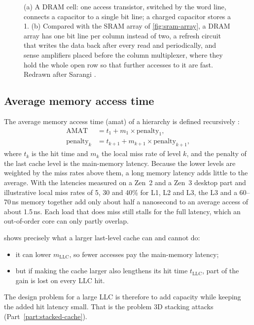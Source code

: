 \begin{figure}[htbp]
\caption[DRAM cell and array]{(a) A DRAM cell: one access transistor, switched by the word line, connects a capacitor to a single bit line; a charged capacitor stores a 1. (b) Compared with the SRAM array of \cref{fig:sram-array}, a DRAM array has one bit line per column instead of two, a refresh circuit that writes the data back after every read and periodically, and sense amplifiers placed before the column multiplexer, where they hold the whole open row so that further accesses to it are fast. Redrawn after Sarangi \cite[sec.~7.4.3, Figs.~7.30--7.31]{sarangi2025basic}.}
\label{fig:dram-array}
\end{figure}

\subsection{Average memory access time}
\label{sec:amat}

The average memory access time (\gls{amat}) of a hierarchy is defined recursively \cite[sec.~11.3.1]{sarangi2025basic}:
\begin{equation}
\begin{aligned}
  \mathrm{AMAT} &= t_1 + m_1 \times \mathrm{penalty}_1,\\
  \mathrm{penalty}_{k} &= t_{k+1} + m_{k+1} \times \mathrm{penalty}_{k+1},
\end{aligned}
\label{eq:amat}
\end{equation}
where $t_k$ is the hit time and $m_k$ the local miss rate of level $k$, and the penalty of the last cache level is the main-memory latency. Because the lower levels are weighted by the miss rates above them, a long memory latency adds little to the average. With the latencies measured on a Zen~2 and a Zen~3 desktop part \cite{justiceAMDRyzen72021} and illustrative local miss rates of 5, 30 and 40\% for L1, L2 and L3, the L3 and a 60--70\,ns memory together add only about half a nanosecond to an average access of about 1.5\,ns. Each load that does miss still stalls for the full latency, which an out-of-order core can only partly overlap.

 shows precisely what a larger last-level cache can and cannot do:
\begin{itemize}
  \item it can lower $m_{\mathrm{LLC}}$, so fewer accesses pay the main-memory latency;
  \item but if making the cache larger also lengthens its hit time $t_{\mathrm{LLC}}$, part of the gain is lost on every LLC hit.
\end{itemize}
The design problem for a large LLC is therefore to add capacity while keeping the added hit latency small. That is the problem 3D stacking attacks (Part~\ref{part:stacked-cache}).

